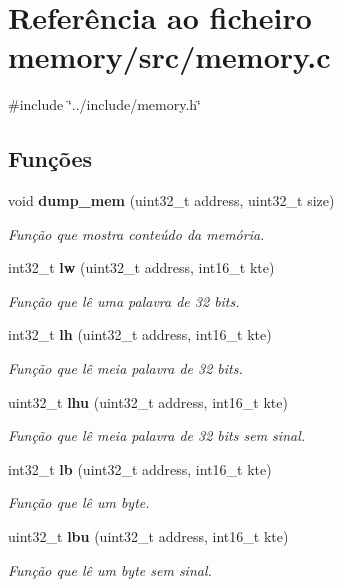 \section{Referência ao ficheiro memory/src/memory.c}
\label{memory_8c}
{\ttfamily \#include \char`\"{}../include/memory.\+h\char`\"{}}\newline
\subsection*{Funções}
\begin{DoxyCompactItemize}
\item 
void \textbf{ dump\+\_\+mem} (uint32\+\_\+t address, uint32\+\_\+t size)
\begin{DoxyCompactList}\small\item\em Função que mostra conteúdo da memória. \end{DoxyCompactList}\item 
int32\+\_\+t \textbf{ lw} (uint32\+\_\+t address, int16\+\_\+t kte)
\begin{DoxyCompactList}\small\item\em Função que lê uma palavra de 32 bits. \end{DoxyCompactList}\item 
int32\+\_\+t \textbf{ lh} (uint32\+\_\+t address, int16\+\_\+t kte)
\begin{DoxyCompactList}\small\item\em Função que lê meia palavra de 32 bits. \end{DoxyCompactList}\item 
uint32\+\_\+t \textbf{ lhu} (uint32\+\_\+t address, int16\+\_\+t kte)
\begin{DoxyCompactList}\small\item\em Função que lê meia palavra de 32 bits sem sinal. \end{DoxyCompactList}\item 
int32\+\_\+t \textbf{ lb} (uint32\+\_\+t address, int16\+\_\+t kte)
\begin{DoxyCompactList}\small\item\em Função que lê um byte. \end{DoxyCompactList}\item 
uint32\+\_\+t \textbf{ lbu} (uint32\+\_\+t address, int16\+\_\+t kte)
\begin{DoxyCompactList}\small\item\em Função que lê um byte sem sinal. \end{DoxyCompactList}\item 

\end{DoxyCompactItemize}
